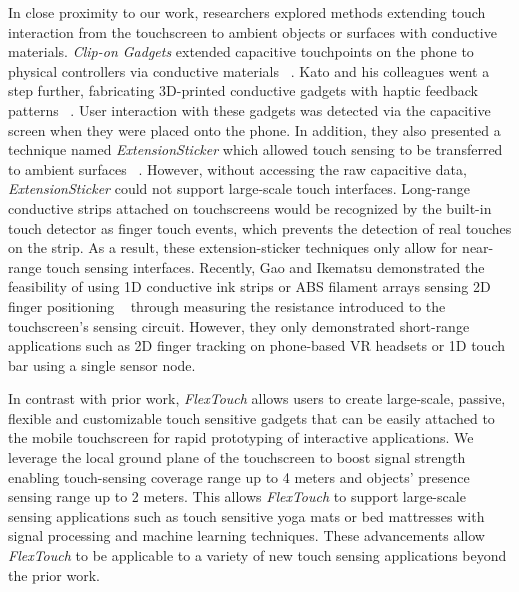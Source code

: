 In close proximity to our work, researchers explored methods extending touch interaction from the touchscreen to ambient objects or surfaces with conductive materials. \textit{Clip-on Gadgets} extended capacitive touchpoints on the phone to physical controllers via conductive materials ~\cite{Yu2011}. Kato and his colleagues went a step further, fabricating 3D-printed conductive gadgets with haptic feedback patterns ~\cite{Kato2016}. User interaction with these gadgets was detected via the capacitive screen when they were placed onto the phone. In addition, they also presented a technique named \textit{ExtensionSticker} which allowed touch sensing to be transferred to ambient surfaces ~\cite{Kato2015, Kato2015a}. However, without accessing the raw capacitive data, \textit{ExtensionSticker} could not support large-scale touch interfaces. Long-range conductive strips attached on touchscreens would be recognized by the built-in touch detector as finger touch events, which prevents the detection of real touches on the strip. As a result, these extension-sticker techniques only allow for near-range touch sensing interfaces. Recently, Gao and Ikematsu demonstrated the feasibility of using 1D conductive ink strips or ABS filament arrays sensing 2D finger positioning ~\cite{mobicom-gao18, Ikematsu-Ohmic-Touch} through measuring the resistance introduced to the touchscreen's sensing circuit. However, they only demonstrated short-range applications such as 2D finger tracking on phone-based VR headsets or 1D touch bar using a single sensor node.

In contrast with prior work, \textit{FlexTouch} allows users to create large-scale, passive, flexible and customizable touch sensitive gadgets that can be easily attached to the mobile touchscreen for rapid prototyping of interactive applications. We leverage the local ground plane of the touchscreen to boost signal strength enabling touch-sensing coverage range up to 4 meters and objects' presence sensing range up to 2 meters. This allows \textit{FlexTouch} to support large-scale sensing applications such as touch sensitive yoga mats or bed mattresses with signal processing and machine learning techniques. These advancements allow \textit{FlexTouch} to be applicable to a variety of new touch sensing applications beyond the prior work.
